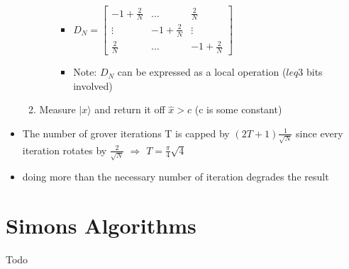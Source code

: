 \documentclass[12pt,a4paper]{article}
\newcommand{\ket}[1]{\vert #1 \rangle}
\begin{document}
\begin{itemize}
\begin{enumerate}
\begin{enumerate}
\begin{itemize}
\item $D_N = \begin{bmatrix} -1 + \frac{2}{N} & \dots & \frac{2}{N} \\ \vdots & -1 + \frac{2}{N}& \vdots\\  \frac{2}{N} & \dots & -1 + \frac{2}{N}\end{bmatrix}$
\item Note: $D_N$ can be expressed as a local operation ($leq 3$ bits involved)
\end{itemize}
\end{enumerate}
\item Measure $\ket{x}$ and return it off $\hat{x}>c$ (c is some constant)
\end{enumerate}
\item The number of grover iterations T is capped by $(2T+1)\frac{1}{\sqrt{N}}$ since every iteration rotates by $\frac{2}{\sqrt{N}}$ $\Rightarrow$ $T=\frac{\pi}{4}\sqrt{4}$
\item doing more than the necessary number of iteration degrades the result
\end{itemize}

\section{Simons Algorithms}
Todo
\end{document}
